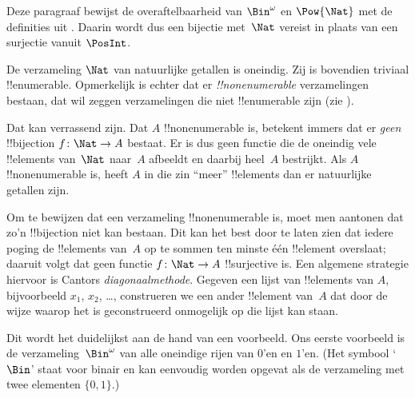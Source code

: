 \documentclass[openany]{memoir}
\begin{document}


\begin{editorial}
  Deze paragraaf bewijst de overaftelbaarheid van $\Bin^\omega$ en
  $\Pow{\Nat}$ met de definities uit . Daarin wordt
  dus een bijectie met~$\Nat$ vereist in plaats van een surjectie
  vanuit $\PosInt$.
\end{editorial}

\begin{explain}
De verzameling $\Nat$ van natuurlijke getallen is oneindig. Zij is
bovendien triviaal !!{enumerable}. Opmerkelijk is echter dat er
\emph{!!{nonenumerable}} verzamelingen bestaan, dat wil zeggen
verzamelingen die niet !!{enumerable} zijn (zie
).

Dat kan verrassend zijn. Dat $A$ !!{nonenumerable} is, betekent immers
dat er \emph{geen} !!{bijection} $f \colon \Nat \to A$ bestaat. Er is
dus geen functie die de oneindig vele !!{element}s van~$\Nat$ naar~$A$
afbeeldt en daarbij heel~$A$ bestrijkt. Als $A$ !!{nonenumerable} is,
heeft $A$ in die zin ``meer'' !!{element}s dan er natuurlijke getallen
zijn.

Om te bewijzen dat een verzameling !!{nonenumerable} is, moet men
aantonen dat zo'n !!{bijection} niet kan bestaan. Dit kan het best door
te laten zien dat iedere poging de !!{element}s van~$A$ op te sommen
ten minste één !!{element} overslaat; daaruit volgt dat geen functie
$f\colon \Nat \to A$ !!{surjective} is. Een algemene strategie
hiervoor is Cantors \emph{diagonaalmethode}. Gegeven een lijst van
!!{element}s van $A$, bijvoorbeeld $x_1$, $x_2$, \dots, construeren we
een ander !!{element} van~$A$ dat door de wijze waarop het is
geconstrueerd onmogelijk op die lijst kan staan.

Dit wordt het duidelijkst aan de hand van een voorbeeld. Ons eerste
voorbeeld is de verzameling~$\Bin^\omega$ van alle oneindige rijen van
$0$'en en $1$'en. (Het symbool `$\Bin$' staat voor binair en kan
eenvoudig worden opgevat als de verzameling met twee elementen
$\{0,1\}$.)
\end{explain}
\end{document}

